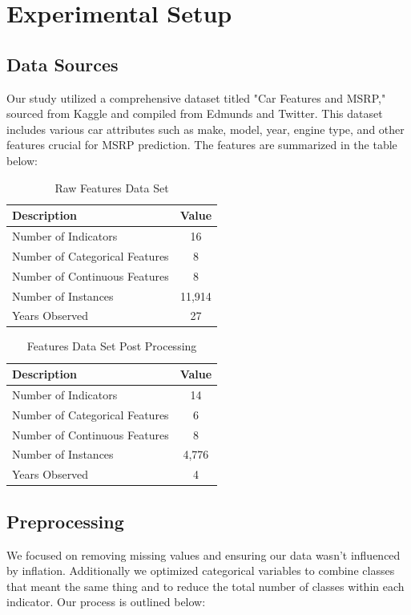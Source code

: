 \documentclass{article}
\begin{document}
\section{Experimental Setup}

\subsection{Data Sources}
Our study utilized a comprehensive dataset titled "Car Features and MSRP," sourced from Kaggle and compiled from Edmunds and Twitter. This dataset includes various car attributes such as make, model, year, engine type, and other features crucial for MSRP prediction. The features are summarized in the table below:

\begin{table}[ht]
\centering
\caption{Raw Features Data Set}
\vspace{3pt}
\begin{tabular}{|l|c|}
\hline
\textbf{Description} & \textbf{Value} \\
\hline
Number of Indicators & 16 \\
Number of Categorical Features & 8 \\
Number of Continuous Features & 8 \\
Number of Instances & 11,914 \\
Years Observed & 27 \\
\hline
\end{tabular}
\label{tab:raw_features_info}
\end{table}

\begin{table}[ht]
\centering
\caption{Features Data Set Post Processing}
\vspace{3pt}
\begin{tabular}{|l|c|}
\hline
\textbf{Description} & \textbf{Value} \\
\hline
Number of Indicators & 14 \\
Number of Categorical Features & 6 \\
Number of Continuous Features & 8 \\
Number of Instances & 4,776 \\
Years Observed & 4 \\
\hline
\end{tabular}
\label{tab:features_info}
\end{table}
\subsection{Preprocessing}
We focused on removing missing values and ensuring our data wasn’t influenced by inflation. Additionally we optimized categorical variables to combine classes that meant the same thing and to reduce the total number of classes within each indicator. Our process is outlined below:
\end{document}
